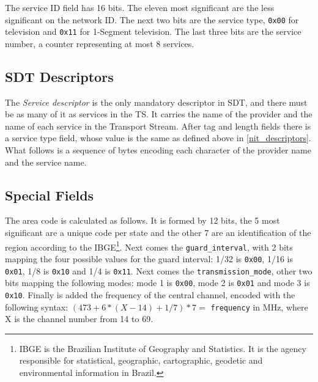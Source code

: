 \documentclass[
	12pt,				%
	openright,			%
	twoside,			%
	a4paper,			%
	brazil,
	french,				%
	english
	]{abntex2}
\begin{document}
The service ID field has 16 bits. The eleven most significant are the less significant on the network ID. The next two bits are the service type, \texttt{0x00} for television and \texttt{0x11} for 1-Segment television. The last three bits are the service number, a counter representing at most 8 services.

\subsection{SDT Descriptors}
\label{sdt_descriptors}

The \textit{Service descriptor} is the only mandatory descriptor in SDT, and there must be as many of it as services in the TS. It carries the name of the provider and the name of each service in the Transport Stream. After tag and length fields there is a service type field, whose value is the same as defined above in \autoref {nit_descriptors}. What follows is a sequence of bytes encoding each character of the provider name and the service name.

\subsection{Special Fields}
\label{special_fields}

The area code is calculated as follows. It is formed by 12 bits, the 5 most significant are a unique code per state and the other 7 are an identification of the region according to the IBGE\footnote{IBGE is the Brazilian Institute of Geography and Statistics. It is the agency responsible for statistical, geographic, cartographic, geodetic and environmental information in Brazil.}. Next comes the \texttt{guard\hspace{0.1mm}\_\hspace{0.1mm}interval}, with 2 bits mapping the four possible values for the guard interval: 1/32 is \texttt{0x00}, 1/16 is \texttt{0x01}, 1/8 is \texttt{0x10} and 1/4 is \texttt{0x11}.  Next comes the \texttt{transmission\hspace{0.1mm}\_\hspace{0.1mm}mode}, other two bits mapping the following modes: mode 1 is \texttt{0x00}, mode 2 is \texttt{0x01} and mode 3 is \texttt{0x10}. Finally is added the frequency of the central channel, encoded with the following syntax: $(473 + 6 * (X - 14) + 1/7) * 7 = $ \texttt{frequency} in MHz, where X is the channel number from 14 to 69.
\end{document}
